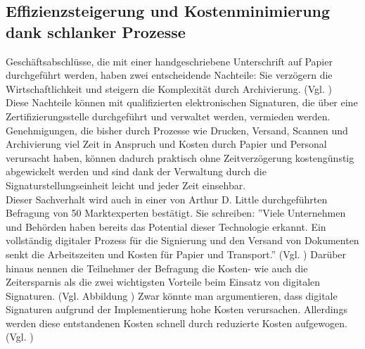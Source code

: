 \documentclass[deutsch]{lib/llncs/llncs}
\begin{document}
\subsection{Effizienzsteigerung und Kostenminimierung dank schlanker Prozesse}
Geschäftsabschlüsse, die mit einer handgeschriebene Unterschrift auf Papier durchgeführt werden, haben zwei entscheidende Nachteile: Sie verzögern die Wirtschaftlichkeit und steigern die Komplexität durch Archivierung. (Vgl. \cite[S. 3]{Zitat05})\\
Diese Nachteile können mit qualifizierten elektronischen Signaturen, die über eine Zertifizierungsstelle durchgeführt und verwaltet werden, vermieden werden. Genehmigungen, die bisher durch Prozesse wie Drucken, Versand, Scannen und Archivierung viel Zeit in Anspruch und Kosten durch Papier und Personal verursacht haben, können dadurch praktisch ohne Zeitverzögerung kostengünstig abgewickelt werden und sind dank der Verwaltung durch die Signaturstellungseinheit leicht und jeder Zeit einsehbar. \\
Dieser Sachverhalt wird auch in einer von Arthur D. Little durchgeführten Befragung von 50 Marktexperten bestätigt. Sie schreiben: ''Viele Unternehmen und Behörden haben bereits das Potential dieser Technologie erkannt. Ein vollständig digitaler Prozess für die Signierung und den Versand von Dokumenten senkt die Arbeitszeiten und Kosten für Papier und Transport.'' (Vgl. \cite[S. 7]{Zitat05})
Darüber hinaus nennen die Teilnehmer der Befragung die Kosten- wie auch die Zeitersparnis als die zwei wichtigsten Vorteile beim Einsatz von digitalen Signaturen. (Vgl. Abbildung \cite[S. 7]{Zitat05})
Zwar könnte man argumentieren, dass digitale Signaturen aufgrund der Implementierung hohe Kosten verursachen. Allerdings werden diese entstandenen Kosten schnell durch reduzierte Kosten aufgewogen. (Vgl. \cite[S. 7]{Zitat05})
\end{document}
